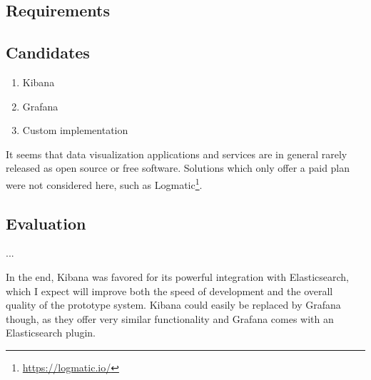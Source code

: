 \subsection{Requirements}

\subsection{Candidates}

\begin{enumerate}
\item Kibana
\item Grafana
\item Custom implementation
\end{enumerate}

It seems that data visualization applications and services are in general rarely released as open source or free software.
Solutions which only offer a paid plan were not considered here, such as Logmatic\footnote{\url{https://logmatic.io/}}.

\subsection{Evaluation}

...

In the end, Kibana was favored for its powerful integration with Elasticsearch, which I expect will improve both the speed of development and the overall quality of the prototype system.
Kibana could easily be replaced by Grafana though, as they offer very similar functionality and Grafana comes with an Elasticsearch plugin.
